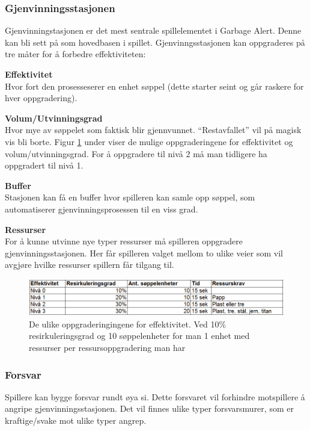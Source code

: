 \subsubsection{Gjenvinningsstasjonen}
Gjenvinningstasjonen er det mest sentrale spillelementet i Garbage
Alert. Denne kan bli sett på som hovedbasen i spillet.
Gjenvinngsstasjonen kan oppgraderes på tre måter for å forbedre effektiviteten:\\
\begin{description}
	\item \textbf{Effektivitet}\\Hvor fort den prosesseserer en enhet søppel (dette starter seint og går raskere for hver oppgradering).
	\item \textbf{Volum/Utvinningsgrad}\\Hvor mye av søppelet som faktisk blir gjennvunnet. “Restavfallet” vil på magisk vis bli borte. Figur \ref{fig:effektivitet} under viser de mulige oppgraderingene for effektivitet og volum/utvinningsgrad. For å oppgradere til nivå 2 må man tidligere ha oppgradert til nivå 1.
	\item \textbf{Buffer}\\Stasjonen kan få en buffer hvor spilleren kan samle opp søppel, som automatiserer gjenvinningsprosessen til en viss grad.
	\item \textbf{Ressurser}\\For å kunne utvinne nye typer ressurser må
		spilleren oppgradere gjenvinningsstasjonen. Her får spilleren valget
		mellom to ulike veier som vil avgjøre hvilke ressurser spillern får
		tilgang til.
\end{description}



		\begin{figure} [H]
				\begin{center}
					\includegraphics[scale=0.5]{images/effektivitet}
				\end{center}
			\caption{De ulike oppgraderingingene for effektivitet. Ved 10\% resirkuleringsgrad og 10 søppelenheter for man 1 enhet med ressurser per ressursoppgradering man har}
			\label{fig:effektivitet}
		\end{figure}



\subsubsection{Forsvar}
Spillere kan bygge forsvar rundt øya si. Dette forsvaret vil forhindre
motspillere å angripe gjenvinningsstasjonen. Det vil finnes ulike typer
forsvarsmurer, som er kraftige/svake mot ulike typer angrep.
